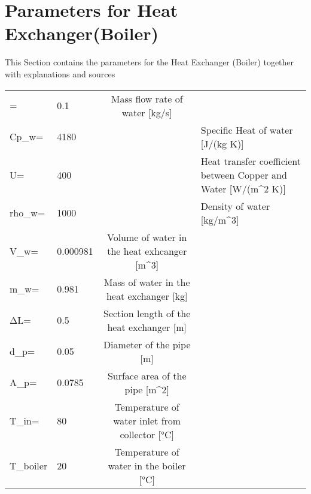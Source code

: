 
	

\section{Parameters for Heat Exchanger(Boiler)} 

This Section contains the parameters for the Heat Exchanger (Boiler) together with explanations and sources 

\begin{tabular}{ l l |c| l} 
	\dot{m_{w}}=		&0.1		&Mass flow rate of water [kg/s]\\     	
	Cp_{w}=		&4180	&\cite{SpecificHeat}	&Specific Heat of water [J/(kg K)]\\     
	U=		&400	&\cite{HeatTransferCoefficientl}	&Heat transfer coefficient between Copper and Water [W/(m^{2} K)] \\
	rho_{w}=		&1000	&\cite{WaterDensity}	&Density of water [kg/m^{3}] \\
	V_{w}=		&0.000981		&Volume of water in the heat exhcanger [m^{3}]  \\
	m_{w}=		&0.981		&Mass of water in the heat exchanger [kg]  \\
	ΔL=		&0.5		&Section length of the heat exchanger [m]  \\
	d_{p}=		&0.05		&Diameter of the pipe [m]  \\
	A_{p}=		&0.0785		&Surface area of the pipe [m^{2}]  \\
	T_{in}=		&80	        &Temperature of water inlet from collector [°C]  \\
	T_{boiler}      &20      &Temperature of water in the boiler [°C] \\
	
	
\end{tabular}



